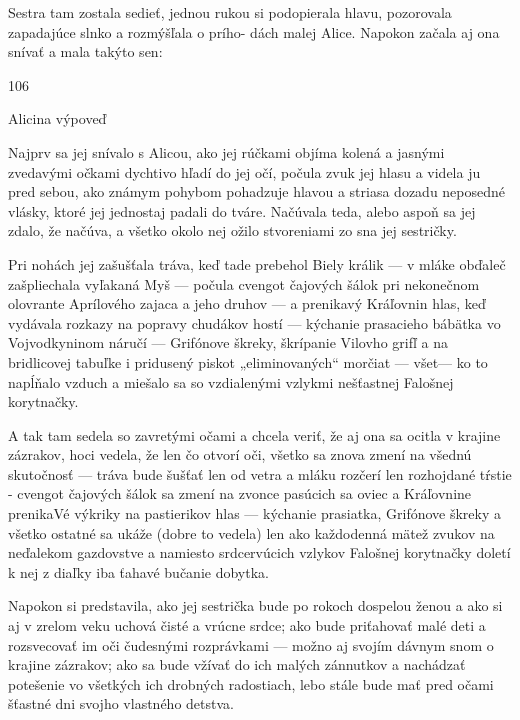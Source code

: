 \documentclass[12pt]{book}
\begin{document}
\begin{Parallel}[p]{}{}
{Sestra tam zostala sedieť, jednou rukou si podopierala
hlavu, pozorovala zapadajúce slnko a rozmýšľala o prího-
dách malej Alice. Napokon začala aj ona snívať a mala
takýto sen:

106

Alicina výpoveď

Najprv sa jej snívalo s Alicou, ako jej rúčkami objíma
kolená a jasnými zvedavými očkami dychtivo hľadí do jej
očí, počula zvuk jej hlasu a videla ju pred sebou, ako
známym pohybom pohadzuje hlavou a striasa dozadu
neposedné vlásky, ktoré jej jednostaj padali do tváre.
Načúvala teda, alebo aspoň sa jej zdalo, že načúva, a všetko
okolo nej ožilo stvoreniami zo sna jej sestričky.

Pri nohách jej zašušťala tráva, keď tade prebehol Biely
králik — v mláke obďaleč zašpliechala vyľakaná Myš
— počula cvengot čajových šálok pri nekonečnom olovrante
Aprílového zajaca a jeho druhov — a prenikavý Kráľovnin
hlas, keď vydávala rozkazy na popravy chudákov hostí
— kýchanie prasacieho bábätka vo Vojvodkyninom náručí
— Grifónove škreky, škrípanie Vilovho grifľ a na bridlicovej
tabuľke i pridusený piskot „eliminovaných“ morčiat — všet—
ko to napĺňalo vzduch a miešalo sa so vzdialenými vzlykmi
nešťastnej Falošnej korytnačky.

A tak tam sedela so zavretými očami a chcela veriť, že aj
ona sa ocitla v krajine zázrakov, hoci vedela, že len čo otvorí
oči, všetko sa znova zmení na všednú skutočnosť — tráva
bude šušťať len od vetra a mláku rozčerí len rozhojdané
tŕstie - cvengot čajových šálok sa zmení na zvonce pasúcich
sa oviec a Kráľovnine prenikaVé výkriky na pastierikov hlas
— kýchanie prasiatka, Grifónove škreky a všetko ostatné sa
ukáže (dobre to vedela) len ako každodenná mätež zvukov
na neďalekom gazdovstve a namiesto srdcervúcich vzlykov
Falošnej korytnačky doletí k nej z diaľky iba ťahavé bučanie
dobytka.

Napokon si predstavila, ako jej sestrička bude po rokoch
dospelou ženou a ako si aj v zrelom veku uchová čisté
a vrúcne srdce; ako bude priťahovať malé deti a rozsvecovať
im oči čudesnými rozprávkami — možno aj svojím dávnym
snom o krajine zázrakov; ako sa bude vžívať do ich malých
zánnutkov a nachádzať potešenie vo všetkých ich drobných
radostiach, lebo stále bude mať pred očami šťastné dni
svojho vlastného detstva.
}  %

\end{Parallel}
\end{document}
